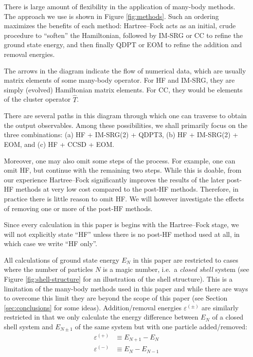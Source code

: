 There is large amount of flexibility in the application of many-body methods.  The approach we use is shown in Figure \ref{fig:methods}.  Such an ordering maximizes the benefits of each method: Hartree--Fock acts as an initial, crude procedure to ``soften'' the Hamiltonian, followed by IM-SRG or CC to refine the ground state energy, and then finally QDPT or EOM to refine the addition and removal energies.

The arrows in the diagram indicate the flow of numerical data, which are usually matrix elements of some many-body operator.  For HF and IM-SRG, they are simply (evolved) Hamiltonian matrix elements.  For CC, they would be elements of the cluster operator $\hat{T}$.

There are several paths in this diagram through which one can traverse to obtain the output observables.  Among these possibilities, we shall primarily focus on the three combinations: (a) HF + IM-SRG(2) + QDPT3, (b) HF + IM-SRG(2) + EOM, and (c) HF + CCSD + EOM.

Moreover, one may also omit some steps of the process.  For example, one can omit HF, but continue with the remaining two steps.  While this is doable, from our experience Hartree--Fock significantly improves the results of the later post-HF methods at very low cost compared to the post-HF methods.  Therefore, in practice there is little reason to omit HF.  We will however investigate the effects of removing one or more of the post-HF methods.

Since every calculation in this paper is begins with the Hartree--Fock stage, we will not explicitly state ``HF'' unless there is no post-HF method used at all, in which case we write ``HF only''.

All calculations of ground state energy $E_N$ in this paper are restricted to cases where the number of particles $N$ is a magic number, i.e.\ a \textit{closed shell} system (see Figure \ref{fig:shell-structure} for an illustration of the shell structure).  This is a limitation of the many-body methods used in this paper and while there are ways to overcome this limit they are beyond the scope of this paper (see Section \ref{sec:conclusions} for some ideas).  Addition/removal energies $\varepsilon^{(\pm)}$ are similarly restricted in that we only calculate the energy difference between $E_N$ of a closed shell system and $E_{N \pm 1}$ of the same system but with one particle added/removed:
\begin{align*}
  \varepsilon^{(+)} &\equiv E_{N + 1} - E_N \\
  \varepsilon^{(-)} &\equiv E_N - E_{N - 1}
\end{align*}

